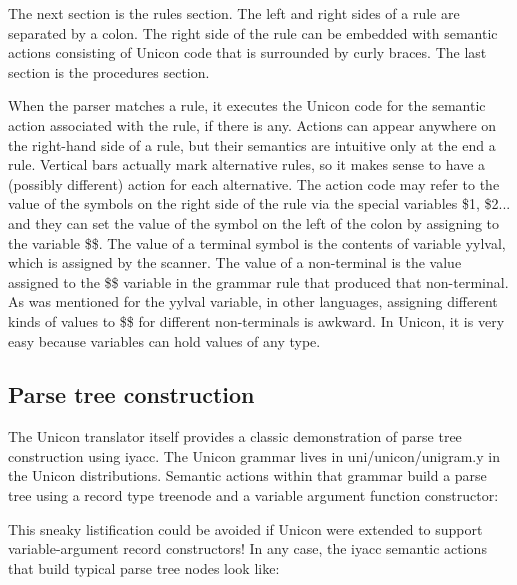 The next section is the rules section. The left and right sides of a
rule are separated by a colon. The right side of the rule can be
embedded with semantic actions consisting of Unicon code that is
surrounded by curly braces. The last section is the procedures section.

When the parser matches a rule, it executes the Unicon code for the
semantic action associated with the rule, if there is any. Actions can
appear anywhere on the right-hand side of a rule, but their semantics
are intuitive only at the end a rule. Vertical bars actually mark
alternative rules, so it makes sense to have a (possibly different)
action for each alternative. The action code may refer to the value of
the symbols on the right side of the rule via the special variables
\textsf{\$1}, \textsf{\$2}... and they can set the value of the symbol
on the left of the colon by assigning to the variable \textsf{\$\$}.
The value of a terminal symbol is the contents of variable
\textsf{yylval}, which is assigned by the scanner. The value of a
non-terminal is the value assigned to the \textsf{\$\$} variable in the
grammar rule that produced that non-terminal. As was mentioned for the
\textsf{yylval} variable, in other languages, assigning different kinds
of values to \textsf{\$\$} for different non-terminals is awkward. In
Unicon, it is very easy because variables can hold values of any type.

\subsection{Parse tree construction}

The Unicon translator itself provides a classic demonstration of parse
tree construction using \textsf{iyacc}. The Unicon grammar lives in
\textsf{uni/unicon/unigram.y} in the Unicon distributions. Semantic
actions within that grammar build a parse tree using a record type
\textsf{treenode} and a variable argument function constructor:


This sneaky listification could be avoided if Unicon were extended to
support variable-argument record constructors! In any case, the iyacc
semantic actions that build typical parse tree nodes look like:

